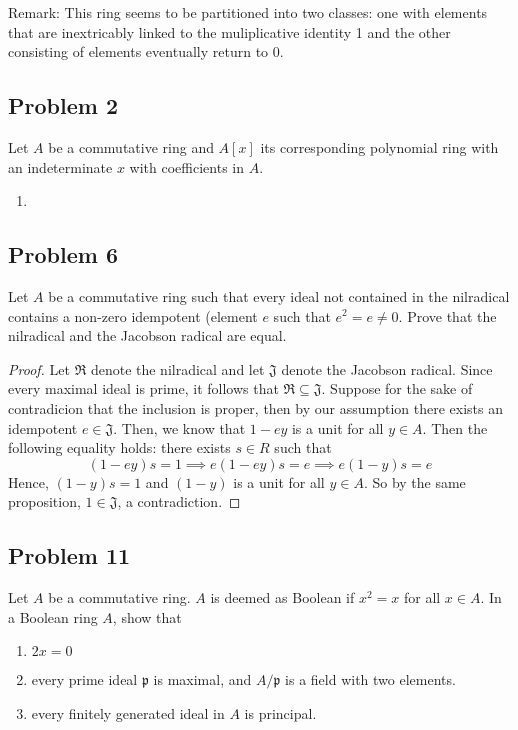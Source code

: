 \documentclass[12pt]{article}
\begin{document}
Remark: This ring seems to be partitioned into two classes: one with elements that are inextricably linked to the muliplicative identity 1 and the other consisting of elements eventually return to 0.


 
\subsection{Problem 2}

Let $A$ be a commutative ring and $A[x]$ its corresponding polynomial ring with an indeterminate $x$ with coefficients in $A$.
\begin{enumerate}
 \item 
\end{enumerate}

\subsection{Problem 6}
Let $A$ be a commutative ring such that every ideal not contained in the nilradical contains a non-zero idempotent (element $e$ such that $e^2 = e \neq 0$. Prove that the nilradical and the Jacobson radical are equal.

\begin{proof}
 Let $\mathfrak{R}$ denote the nilradical and let $\mathfrak{J}$ denote the Jacobson radical. Since every maximal ideal is prime, it follows that $\mathfrak{R} \subseteq \mathfrak{J}$. Suppose for the sake of contradicion that the inclusion is proper, then by our assumption there exists an idempotent $e \in \mathfrak{J}$. Then, we know that $1-ey$ is a unit for all $y \in A$. Then the following equality holds: there exists $s \in R$ such that 
 $$(1-ey)s = 1 \implies e(1-ey)s = e \implies e(1-y)s = e$$
 Hence, $(1-y)s = 1$ and $(1-y)$ is a unit for all $y \in A$. So by the same proposition, $1 \in \mathfrak{J}$, a contradiction.
\end{proof}

\subsection{Problem 11} 
Let $A$ be a commutative ring. $A$ is deemed as Boolean if $x^2 = x$ for all $x \in A$. In a Boolean ring $A$, show that
\begin{enumerate}
 \item $2x = 0$
 \item every prime ideal $\mathfrak{p}$ is maximal, and $A/\mathfrak{p}$ is a field with two elements.
 \item every finitely generated ideal in $A$ is principal.
\end{enumerate}
\end{document}
